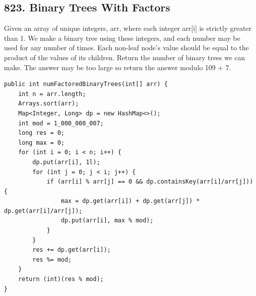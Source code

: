 \documentclass[9pt, b5paaper]{book}
\begin{document}
\subsection{823. Binary Trees With Factors}
\label{sec-1-4-44}
Given an array of unique integers, arr, where each integer arr[i] is strictly greater than 1.
We make a binary tree using these integers, and each number may be used for any number of times. Each non-leaf node's value should be equal to the product of the values of its children.
Return the number of binary trees we can make. The answer may be too large so return the answer modulo 109 + 7.
\begin{verbatim}
public int numFactoredBinaryTrees(int[] arr) {
    int n = arr.length;
    Arrays.sort(arr);
    Map<Integer, Long> dp = new HashMap<>();
    int mod = 1_000_000_007;
    long res = 0;
    long max = 0;
    for (int i = 0; i < n; i++) {
        dp.put(arr[i], 1l);
        for (int j = 0; j < i; j++) {
            if (arr[i] % arr[j] == 0 && dp.containsKey(arr[i]/arr[j])) {
                max = dp.get(arr[i]) + dp.get(arr[j]) * dp.get(arr[i]/arr[j]);
                dp.put(arr[i], max % mod);
            }
        }
        res += dp.get(arr[i]);
        res %= mod;
    }
    return (int)(res % mod);
}
\end{verbatim}
\end{document}
